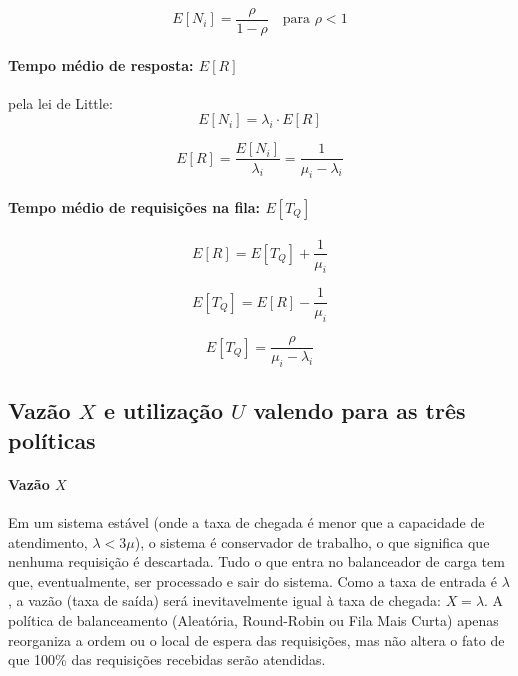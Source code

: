 \documentclass[conference]{IEEE_Conference_Template/IEEEtran}
\begin{document}
\begin{equation}
E[N_i] = \frac{\rho}{1 - \rho} \quad \text{para } \rho < 1
\end{equation}

\paragraph{Tempo médio de resposta: $E[R]$}
pela lei de Little:
\begin{equation}
E[N_i] = \lambda_i \cdot E[R]
\end{equation}

\begin{equation}
E[R] = \frac{E[N_i]}{\lambda_i} = \frac{1}{\mu_i - \lambda_i}
\end{equation}

\paragraph{Tempo médio de requisições na fila: $E[T_Q]$}
\begin{equation}
E[R] = E[T_Q] + \frac{1}{\mu_i}
\end{equation}

\begin{equation}
E[T_Q] = E[R] - \frac{1}{\mu_i}
\end{equation}

\begin{equation}
E[T_Q] = \frac{\rho}{\mu_i - \lambda_i}
\end{equation}

\subsection{Vazão $X$ e utilização $U$ valendo para as três políticas}

\paragraph{Vazão $X$}
Em um sistema estável (onde a taxa de chegada é menor que a capacidade de atendimento, $\lambda < 3\mu$), o sistema é conservador de trabalho, o que significa que nenhuma requisição é descartada. Tudo o que entra no balanceador de carga tem que, eventualmente, ser processado e sair do sistema. Como a taxa de entrada é $\lambda$, a vazão (taxa de saída) será inevitavelmente igual à taxa de chegada: $X = \lambda$. A política de balanceamento (Aleatória, Round-Robin ou Fila Mais Curta) apenas reorganiza a ordem ou o local de espera das requisições, mas não altera o fato de que 100\% das requisições recebidas serão atendidas.
\end{document}

